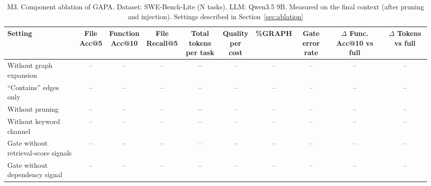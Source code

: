 \begin{table}[t]\scriptsize\centering\setlength{\tabcolsep}{3pt}
\caption{M3. Component ablation of GAPA. Dataset: SWE-Bench-Lite (N tasks). LLM: Qwen3.5 9B. Measured on the final context (after pruning and injection). Settings described in Section~\ref{sec:ablation}}\label{tab:m3}
\begin{tabular}{@{}p{}ccccccccc@{}}\toprule
Setting & \makecell{File\\Acc@5} & \makecell{Function\\Acc@10} & \makecell{File\\Recall@5} & \makecell{Total tokens\\per task} & \makecell{Quality\\per cost} & \%GRAPH & \makecell{Gate\\error rate} & \makecell{$\Delta$ Func.\\Acc@10 vs full} & \makecell{$\Delta$ Tokens\\vs full}\\
\midrule
Without graph expansion & -- & -- & -- & -- & -- & -- & -- & -- & --\\
``Contains'' edges only & -- & -- & -- & -- & -- & -- & -- & -- & --\\
Without pruning & -- & -- & -- & -- & -- & -- & -- & -- & --\\
Without keyword channel & -- & -- & -- & -- & -- & -- & -- & -- & --\\
Gate without retrieval-score signals & -- & -- & -- & -- & -- & -- & -- & -- & --\\
Gate without dependency signal & -- & -- & -- & -- & -- & -- & -- & -- & --\\
\bottomrule
\end{tabular}
\end{table}
